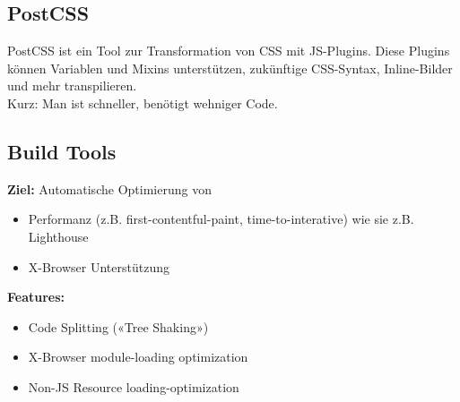 \subsection{PostCSS}
PostCSS ist ein Tool zur Transformation von CSS mit JS-Plugins. Diese Plugins können Variablen und Mixins unterstützen, zukünftige CSS-Syntax, Inline-Bilder und mehr transpilieren.\\
Kurz: Man ist schneller, benötigt wehniger Code.

\subsection{Build Tools}
\textbf{Ziel:} Automatische Optimierung von
\begin{itemize}
    \item Performanz (z.B. first-contentful-paint, time-to-interative) wie sie z.B. Lighthouse
    \item X-Browser Unterstützung
\end{itemize}
\textbf{Features:}
\begin{itemize}
    \item Code Splitting («Tree Shaking»)
    \item X-Browser module-loading optimization
    \item Non-JS Resource loading-optimization
\end{itemize}

\vfill